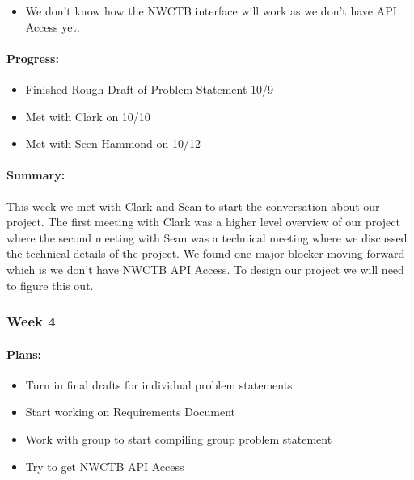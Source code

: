 \documentclass[onecolumn, draftclsnofoot,10pt, compsoc]{article}
\begin{document}
		    \begin{itemize}
		        \item We don't know how the NWCTB interface will work as we don't have API Access yet.
		    \end{itemize}
		
		    \paragraph{Progress:} \hfill \break

		    \begin{itemize}
		        \item Finished Rough Draft of Problem Statement 10/9
		        \item Met with Clark on 10/10
		        \item Met with Seen Hammond on 10/12
		    \end{itemize}
		    
		    \paragraph{Summary:} \hfill \break
		    	This week we met with Clark and Sean to start the conversation about our project. The first meeting with Clark was a higher level overview of our project where the second meeting with Sean was a technical meeting where we discussed the technical details of the project. We found one major blocker moving forward which is we don't have NWCTB API Access. To design our project we will need to figure this out.\\ 
		        
		\subsubsection{Week 4}
		
		    \paragraph{Plans:} \hfill \break
		        
		        \begin{itemize}
		            \item Turn in final drafts for individual problem statements
		            \item Start working on Requirements Document
		            \item Work with group to start compiling group problem statement
		            \item Try to get NWCTB API Access
		        \end{itemize}
		        
\end{document}
